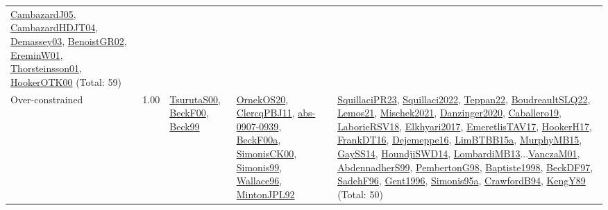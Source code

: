 {\begin{longtable}{p{3cm}r>{\raggedright\arraybackslash}p{6cm}>{\raggedright\arraybackslash}p{6cm}>{\raggedright\arraybackslash}p{8cm}}
\hyperref[detail:CambazardJ05]{CambazardJ05}, \hyperref[detail:CambazardHDJT04]{CambazardHDJT04}, \hyperref[detail:Demassey03]{Demassey03}, \hyperref[detail:BenoistGR02]{BenoistGR02}, \hyperref[detail:EreminW01]{EreminW01}, \hyperref[detail:Thorsteinsson01]{Thorsteinsson01}, \hyperref[detail:HookerOTK00]{HookerOTK00} (Total: 59)\\
\index{Over-constrained}\index{Concepts!Over-constrained}Over-constrained &  1.00 & \hyperref[detail:TsurutaS00]{TsurutaS00}, \hyperref[detail:BeckF00]{BeckF00}, \hyperref[detail:Beck99]{Beck99} & \hyperref[detail:OrnekOS20]{OrnekOS20}, \hyperref[detail:ClercqPBJ11]{ClercqPBJ11}, \hyperref[detail:abs-0907-0939]{abs-0907-0939}, \hyperref[detail:BeckF00a]{BeckF00a}, \hyperref[detail:SimonisCK00]{SimonisCK00}, \hyperref[detail:Simonis99]{Simonis99}, \hyperref[detail:Wallace96]{Wallace96}, \hyperref[detail:MintonJPL92]{MintonJPL92} & \hyperref[detail:SquillaciPR23]{SquillaciPR23}, \hyperref[detail:Squillaci2022]{Squillaci2022}, \hyperref[detail:Teppan22]{Teppan22}, \hyperref[detail:BoudreaultSLQ22]{BoudreaultSLQ22}, \hyperref[detail:Lemos21]{Lemos21}, \hyperref[detail:Mischek2021]{Mischek2021}, \hyperref[detail:Danzinger2020]{Danzinger2020}, \hyperref[detail:Caballero19]{Caballero19}, \hyperref[detail:LaborieRSV18]{LaborieRSV18}, \hyperref[detail:Elkhyari2017]{Elkhyari2017}, \hyperref[detail:EmeretlisTAV17]{EmeretlisTAV17}, \hyperref[detail:HookerH17]{HookerH17}, \hyperref[detail:FrankDT16]{FrankDT16}, \hyperref[detail:Dejemeppe16]{Dejemeppe16}, \hyperref[detail:LimBTBB15a]{LimBTBB15a}, \hyperref[detail:MurphyMB15]{MurphyMB15}, \hyperref[detail:GaySS14]{GaySS14}, \hyperref[detail:HoundjiSWD14]{HoundjiSWD14}, \hyperref[detail:LombardiMB13]{LombardiMB13}...\hyperref[detail:VanczaM01]{VanczaM01}, \hyperref[detail:AbdennadherS99]{AbdennadherS99}, \hyperref[detail:PembertonG98]{PembertonG98}, \hyperref[detail:Baptiste1998]{Baptiste1998}, \hyperref[detail:BeckDF97]{BeckDF97}, \hyperref[detail:SadehF96]{SadehF96}, \hyperref[detail:Gent1996]{Gent1996}, \hyperref[detail:Simonis95a]{Simonis95a}, \hyperref[detail:CrawfordB94]{CrawfordB94}, \hyperref[detail:KengY89]{KengY89} (Total: 50)\\

\end{longtable}}
